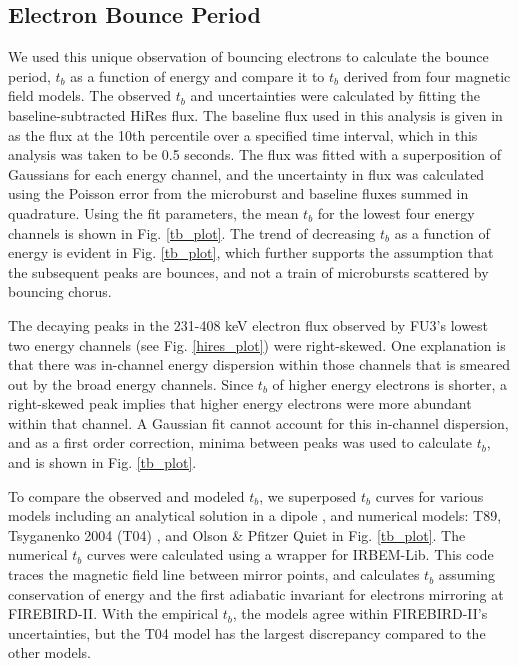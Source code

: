 \documentclass[draft, linenumbers]{agujournal}
\begin{document}
\subsection{Electron Bounce Period} \label{t_b} %
We used this unique observation of bouncing electrons to calculate the bounce period, $t_b$ as a function of energy and compare it to $t_b$ derived from four magnetic field models. The observed $t_b$ and uncertainties were calculated by fitting the baseline-subtracted HiRes flux. The baseline flux used in this analysis is given in \citet{O'Brien2004} as the flux at the 10th percentile over a specified time interval, which in this analysis was taken to be 0.5 seconds. The flux was fitted with a superposition of Gaussians for each energy channel, and the uncertainty in flux was calculated using the Poisson error from the microburst and baseline fluxes summed in quadrature. Using the fit parameters, the mean $t_b$ for the lowest four energy channels is shown in Fig. \ref{tb_plot}. The trend of decreasing $t_b$ as a function of energy is evident in Fig. \ref{tb_plot}, which further supports the assumption that the subsequent peaks are bounces, and not a train of microbursts scattered by bouncing chorus. 

The decaying peaks in the 231-408 keV electron flux observed by FU3's lowest two energy channels (see Fig. \ref{hires_plot}) were right-skewed. One explanation is that there was in-channel energy dispersion within those channels that is smeared out by the broad energy channels. Since $t_b$ of higher energy electrons is shorter, a right-skewed peak implies that higher energy electrons were more abundant within that channel. A Gaussian fit cannot account for this in-channel dispersion, and as a first order correction, minima between peaks was used to calculate $t_b$, and is shown in Fig. \ref{tb_plot}. 

To compare the observed and modeled $t_b$, we superposed $t_b$ curves for various models including an analytical solution in a dipole \citep{Schulz1974}, and numerical models: T89, Tsyganenko 2004 (T04) \citep{Tsyganenko2005}, and Olson \& Pfitzer Quiet \citep{Olson1982} in Fig. \ref{tb_plot}. The numerical $t_b$ curves were calculated using a wrapper for IRBEM-Lib. This code traces the magnetic field line between mirror points, and calculates $t_b$ assuming conservation of energy and the first adiabatic invariant for electrons mirroring at FIREBIRD-II. With the empirical $t_b$, the models agree within FIREBIRD-II's uncertainties, but the T04 model has the largest discrepancy compared to the other models.
\end{document}
